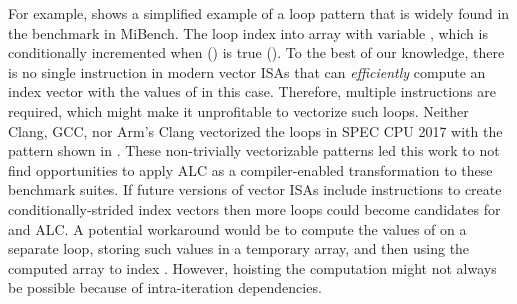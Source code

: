 For example,  shows a simplified example of a loop pattern that is widely found in the  benchmark in MiBench.
The loop index into array  with variable , which is conditionally incremented when ()  is true ().
To the best of our knowledge, there is no single instruction in modern vector ISAs that can \textit{efficiently} compute an index vector with the values of  in this case.
Therefore, multiple instructions are required, which might make it unprofitable to vectorize such loops.
Neither Clang, GCC, nor Arm's Clang vectorized the loops in SPEC CPU 2017 with the pattern shown in .
These non-trivially vectorizable patterns led this work to not find opportunities to apply ALC as a compiler-enabled transformation to these benchmark suites.
If future versions of vector ISAs include instructions to create conditionally-strided index vectors then more loops could become candidates for \ifconversion and ALC.
A potential workaround would be to compute the values of  on a separate loop, storing such values in a temporary array, and then using the computed array to index .
However, hoisting the computation might not always be possible because of intra-iteration dependencies.
